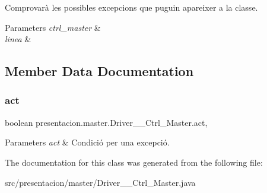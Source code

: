 Comprovarà les possibles excepcions que puguin apareixer a la classe. 


\begin{DoxyParams}{Parameters}
{\em ctrl\+\_\+master} & \\
\hline
{\em linea} & \\
\hline
\end{DoxyParams}


\subsection{Member Data Documentation}
\mbox{\label{classpresentacion_1_1master_1_1Driver____Ctrl__Master_a76b217371c1036ed3e4e46d2c8d427c4}} 
\subsubsection{\texorpdfstring{act}{act}}
{\footnotesize\ttfamily boolean presentacion.\+master.\+Driver\+\_\+\+\_\+\+Ctrl\+\_\+\+Master.\+act\hspace{0.3cm}{\ttfamily [static]}, {\ttfamily [private]}}


\begin{DoxyParams}{Parameters}
{\em act} & Condició per una excepció. \\
\hline
\end{DoxyParams}


The documentation for this class was generated from the following file\+:\begin{DoxyCompactItemize}
\item 
src/presentacion/master/Driver\+\_\+\+\_\+\+Ctrl\+\_\+\+Master.\+java\end{DoxyCompactItemize}

